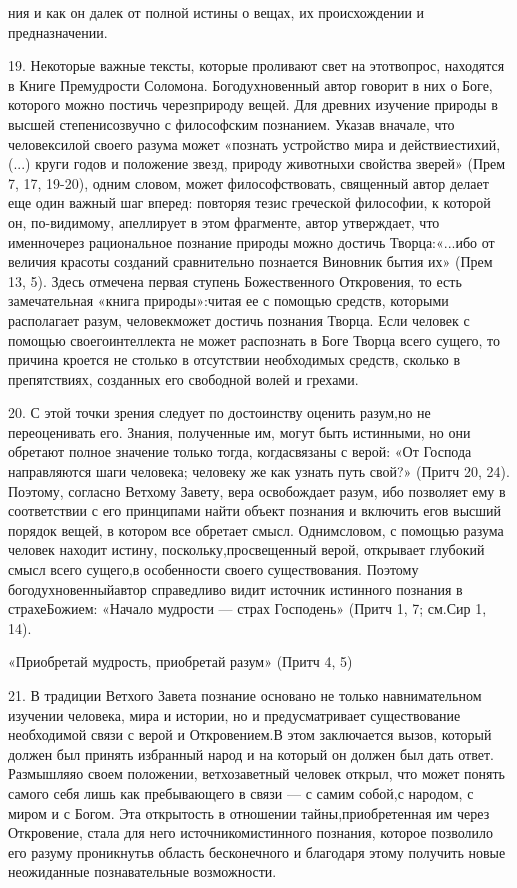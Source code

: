 \documentclass[a5paper,10pt]{article}
\begin{document}
ния и как он далек от полной истины о вещах, их происхождении и предназначении.

19. Некоторые важные тексты, которые проливают свет на этотвопрос, находятся в
Книге Премудрости Соломона. Богодухновенный автор говорит в них о Боге,
которого можно постичь черезприроду вещей. Для древних изучение природы в
высшей степенисозвучно с философским познанием. Указав вначале, что
человексилой своего разума может «познать устройство мира и действиестихий,
(...) круги годов и положение звезд, природу животныхи свойства зверей» (Прем
7, 17, 19-20), одним словом, может философствовать, священный автор делает еще
один важный шаг вперед: повторяя тезис греческой философии, к которой он,
по-видимому, апеллирует в этом фрагменте, автор утверждает, что именночерез
рациональное познание природы можно достичь Творца:«...ибо от величия красоты
созданий сравнительно познается Виновник бытия их» (Прем 13, 5). Здесь отмечена
первая ступень Божественного Откровения, то есть замечательная «книга
природы»:читая ее с помощью средств, которыми располагает разум, человекможет
достичь познания Творца. Если человек с помощью своегоинтеллекта не может
распознать в Боге Творца всего сущего, то причина кроется не столько в
отсутствии необходимых средств, сколько в препятствиях, созданных его свободной
волей и грехами.

20. С этой точки зрения следует по достоинству оценить разум,но не
переоценивать его. Знания, полученные им, могут быть истинными, но они обретают
полное значение только тогда, когдасвязаны с верой: «От Господа направляются
шаги человека; человеку же как узнать путь свой?» (Притч 20, 24). Поэтому,
согласно Ветхому Завету, вера освобождает разум, ибо позволяет ему в
соответствии с его принципами найти объект познания и включить егов высший
порядок вещей, в котором все обретает смысл. Однимсловом, с помощью разума
человек находит истину, поскольку,просвещенный верой, открывает глубокий смысл
всего сущего,в особенности своего существования. Поэтому богодухновенныйавтор
справедливо видит источник истинного познания в страхеБожием: «Начало мудрости
— страх Господень» (Притч 1, 7; см.Сир 1, 14).

«Приобретай мудрость, приобретай разум» (Притч 4, 5)

21. В традиции Ветхого Завета познание основано не только навнимательном
изучении человека, мира и истории, но и предусматривает существование
необходимой связи с верой и Откровением.В этом заключается вызов, который
должен был принять избранный народ и на который он должен был дать ответ.
Размышляяо своем положении, ветхозаветный человек открыл, что может понять
самого себя лишь как пребывающего в связи — с самим собой,с народом, с миром и
с Богом. Эта открытость в отношении тайны,приобретенная им через Откровение,
стала для него источникомистинного познания, которое позволило его разуму
проникнутьв область бесконечного и благодаря этому получить новые неожиданные
познавательные возможности.
\end{document}
